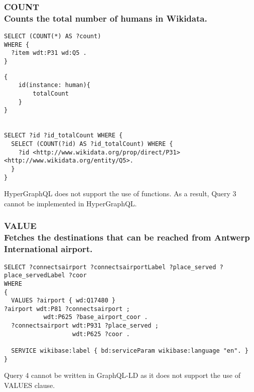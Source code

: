 \subsubsection{COUNT \\Counts the total number of humans in Wikidata.}

\begin{minipage}{\linewidth}
\begin{lstlisting}[label=listing:listing40, caption={Query 3}]
SELECT (COUNT(*) AS ?count)
WHERE {
  ?item wdt:P31 wd:Q5 .
}
\end{lstlisting}
\end{minipage}


\begin{minipage}{\linewidth}
\begin{lstlisting}[label=listing:listing41, caption={Query 3 - GraphQL-LD}]
{
    id(instance: human){
        totalCount
    }
}


SELECT ?id ?id_totalCount WHERE { 
  SELECT (COUNT(?id) AS ?id_totalCount) WHERE { 
    ?id <http://www.wikidata.org/prop/direct/P31> <http://www.wikidata.org/entity/Q5>. 
  } 
}
\end{lstlisting}
\end{minipage}


HyperGraphQL does not support the use of functions. As a result, Query 3 cannot be implemented in HyperGraphQL.



\subsubsection{VALUE \\Fetches the destinations that can be reached from Antwerp International airport.}

\begin{minipage}{\linewidth}
\begin{lstlisting}[label=listing:listing43, caption={Query 4}]
SELECT ?connectsairport ?connectsairportLabel ?place_served ?place_servedLabel ?coor
WHERE
{
  VALUES ?airport { wd:Q17480 }  
?airport wdt:P81 ?connectsairport ;
           wdt:P625 ?base_airport_coor .
  ?connectsairport wdt:P931 ?place_served ;
                   wdt:P625 ?coor .

  SERVICE wikibase:label { bd:serviceParam wikibase:language "en". }
}
\end{lstlisting}
\end{minipage}

Query 4 cannot be written in GraphQL-LD as it does not support the use of VALUES clause.

